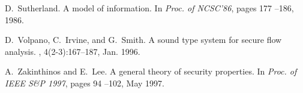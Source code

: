 \documentclass[10pt,a4paper,oneside]{article}
\begin{document}
\begin{thebibliography}{10}
D.~Sutherland.
\newblock A model of information.
\newblock In {\em Proc. of NCSC'86}, pages 177 --186, 1986.

D.~Volpano, C.~Irvine, and G.~Smith.
\newblock A sound type system for secure flow analysis.
, 4(2-3):167--187, Jan. 1996.

A.~Zakinthinos and E.~Lee.
\newblock A general theory of security properties.
\newblock In {\em Proc. of IEEE S\&P 1997}, pages 94 --102, May 1997.

\end{thebibliography}
\newpage
\appendix
\end{document}
